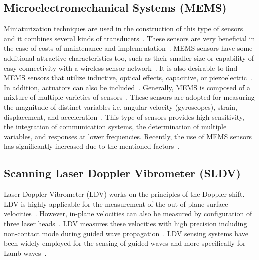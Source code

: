 \documentclass[b5paper, 11pt, titlepage]{book}
\begin{document}
\subsection{Microelectromechanical Systems (MEMS)}
Miniaturization techniques are used in the construction of this type of sensors and it combines several kinds of transducers~\cite{Zhen2017}. These sensors are very beneficial in the case of costs of maintenance and implementation~\cite{cochran2012comparison}. MEMS sensors have some additional attractive characteristics too, such as their smaller size or capability of easy connectivity with a wireless sensor network~\cite{TibaduizaBurgos2020}. It is also desirable to find MEMS sensors that utilize inductive, optical effects, capacitive, or piezoelectric~\cite{chang2013structural, Saboonchi2016}. In addition, actuators can also be included~\cite{Dixit2018}. Generally, MEMS is composed of a mixture of multiple varieties of sensors~\cite{debeda2014study}. These sensors are adopted for measuring the magnitude of distinct variables i.e. angular velocity (gyroscopes), strain, displacement, and acceleration~\cite{Farrar2012, TibaduizaBurgos2020}. This type of sensors provides high sensitivity, the integration of communication systems, the determination of multiple variables, and responses at lower frequencies. Recently, the use of MEMS sensors has significantly increased due to the mentioned factors~\cite{Farrar2012, TibaduizaBurgos2020}.

\subsection{Scanning Laser Doppler Vibrometer (SLDV)}
Laser Doppler Vibrometer (LDV) works on the principles of the Doppler shift. LDV is highly applicable for the measurement of the out-of-plane surface velocities~\cite{Mitra2016}. However, in-plane velocities can also be measured by configuration of three laser heads~\cite{Staszewski2007}.  LDV measures these velocities with high precision including non-contact mode during guided wave propagation~\cite{Mitra2016}. LDV sensing systems have been widely employed for the sensing of guided waves and more specifically for Lamb waves~\cite{Mitra2016}. 
\end{document}
